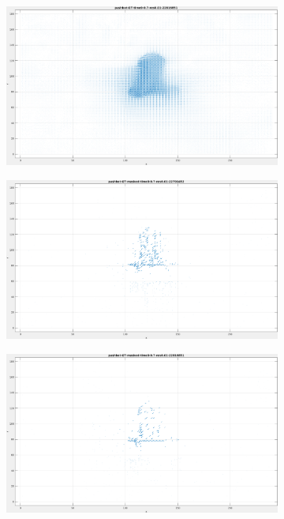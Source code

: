 \begin{appendix}
\begin{figure}[tb]
\begin{subfigure}{.45\textwidth}
  \caption{}
\end{subfigure}
\begin{subfigure}{.45\textwidth}
  \centering
  \includegraphics[height=.6\linewidth]{figs/pushbot/pushbot-GT-2.png}
  \caption{}
\end{subfigure}
\begin{subfigure}{.45\textwidth}
  \centering
  \includegraphics[height=.6\linewidth]{figs/pushbot/pushbot-GT-masked-1.png}
  \caption{}
\end{subfigure}
\begin{subfigure}{.45\textwidth}
  \centering
  \includegraphics[height=.6\linewidth]{figs/pushbot/pushbot-GT-masked-2.png}

\end{subfigure}
\end{figure}
\end{appendix}
